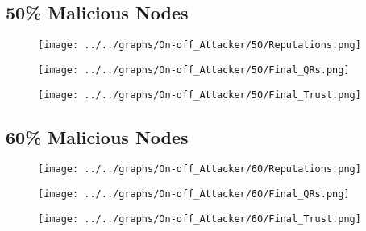 \begin{minipage}[t]{0.49\columnwidth}
\subsection*{50\% Malicious Nodes}
    \begin{figure}[H]
        \centering
        \texttt{[image: ../../graphs/On-off\_Attacker/50/Reputations.png]}
    \end{figure}
    \begin{figure}[H]
        \centering
        \texttt{[image: ../../graphs/On-off\_Attacker/50/Final\_QRs.png]}
    \end{figure}
\end{minipage}
\begin{minipage}[t]{0.49\columnwidth}
    \begin{figure}[H]
        \centering
        \texttt{[image: ../../graphs/On-off\_Attacker/50/Final\_Trust.png]}
    \end{figure}
\end{minipage}

\begin{minipage}[t]{0.49\columnwidth}
\subsection*{60\% Malicious Nodes}
    \begin{figure}[H]
        \centering
        \texttt{[image: ../../graphs/On-off\_Attacker/60/Reputations.png]}
    \end{figure}
    \begin{figure}[H]
        \centering
        \texttt{[image: ../../graphs/On-off\_Attacker/60/Final\_QRs.png]}
    \end{figure}
\end{minipage}
\begin{minipage}[t]{0.49\columnwidth}
    \begin{figure}[H]
        \centering
        \texttt{[image: ../../graphs/On-off\_Attacker/60/Final\_Trust.png]}
    \end{figure}
\end{minipage}

